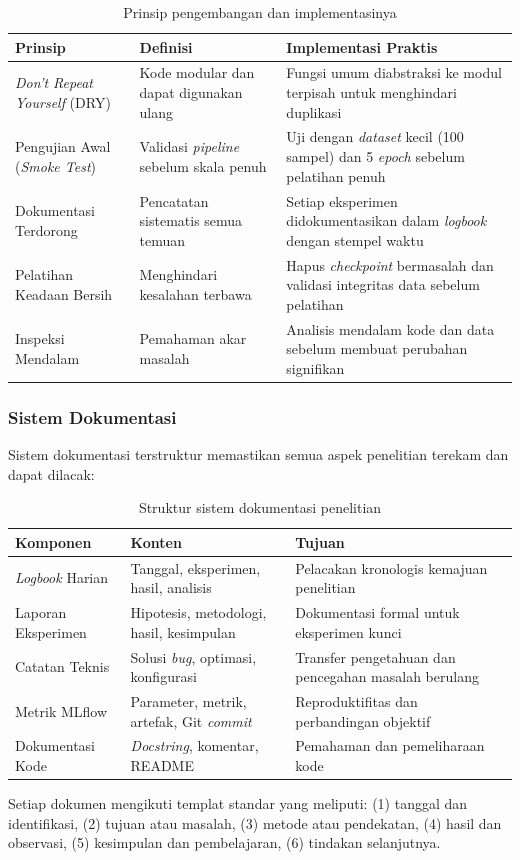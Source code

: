 \documentclass[12pt,a4paper]{article}
\begin{document}
\begin{table}[H]
\centering
\caption{Prinsip pengembangan dan implementasinya}
\label{tab:development-principles}
\small
\begin{tabular}{|p{4cm}|p{5cm}|p{5cm}|}
\hline
\textbf{Prinsip} & \textbf{Definisi} & \textbf{Implementasi Praktis} \\ \hline
\textit{Don't Repeat Yourself} (DRY) & Kode modular dan dapat digunakan ulang & Fungsi umum diabstraksi ke modul terpisah untuk menghindari duplikasi \\ \hline
Pengujian Awal (\textit{Smoke Test}) & Validasi \textit{pipeline} sebelum skala penuh & Uji dengan \textit{dataset} kecil (100 sampel) dan 5 \textit{epoch} sebelum pelatihan penuh \\ \hline
Dokumentasi Terdorong & Pencatatan sistematis semua temuan & Setiap eksperimen didokumentasikan dalam \textit{logbook} dengan stempel waktu \\ \hline
Pelatihan Keadaan Bersih & Menghindari kesalahan terbawa & Hapus \textit{checkpoint} bermasalah dan validasi integritas data sebelum pelatihan \\ \hline
Inspeksi Mendalam & Pemahaman akar masalah & Analisis mendalam kode dan data sebelum membuat perubahan signifikan \\ \hline
\end{tabular}
\end{table}

\subsubsection{Sistem Dokumentasi}
Sistem dokumentasi terstruktur memastikan semua aspek penelitian terekam dan dapat dilacak:

\begin{table}[H]
\centering
\caption{Struktur sistem dokumentasi penelitian}
\label{tab:documentation-system}
\small
\begin{tabular}{|l|p{5cm}|p{5.5cm}|}
\hline
\textbf{Komponen} & \textbf{Konten} & \textbf{Tujuan} \\ \hline
\textit{Logbook} Harian & Tanggal, eksperimen, hasil, analisis & Pelacakan kronologis kemajuan penelitian \\ \hline
Laporan Eksperimen & Hipotesis, metodologi, hasil, kesimpulan & Dokumentasi formal untuk eksperimen kunci \\ \hline
Catatan Teknis & Solusi \textit{bug}, optimasi, konfigurasi & Transfer pengetahuan dan pencegahan masalah berulang \\ \hline
Metrik MLflow & Parameter, metrik, artefak, Git \textit{commit} & Reproduktifitas dan perbandingan objektif \\ \hline
Dokumentasi Kode & \textit{Docstring}, komentar, README & Pemahaman dan pemeliharaan kode \\ \hline
\end{tabular}
\end{table}

Setiap dokumen mengikuti templat standar yang meliputi: (1) tanggal dan identifikasi, (2) tujuan atau masalah, (3) metode atau pendekatan, (4) hasil dan observasi, (5) kesimpulan dan pembelajaran, (6) tindakan selanjutnya.
\end{document}
